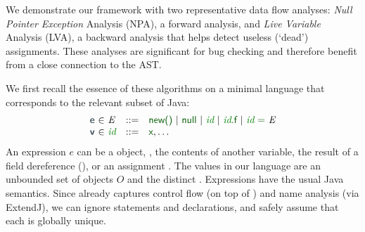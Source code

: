 We demonstrate our framework with two representative data flow analyses:
\emph{Null Pointer Exception} Analysis (NPA), a forward analysis, and \emph{Live Variable} Analysis (LVA), a backward analysis that helps detect useless (`dead') assignments.
These analyses are significant for bug checking and therefore benefit from a close connection to the AST.

We first recall the essence of these algorithms on a minimal language that corresponds to the relevant subset of Java: %
\[
\begin{array}{r@{\ }c@{\ }lcll}
  \vmetavar{e}& \in &
  \nta{E}	& \Prod	& \vterminal{new()}
  			  \VB{}
        		  \vterminal{null}
			  \VB{}
        		  \terminal{id}
			  \VB{}
        		  \terminal{id} \vterminal{.f}
                          \VB{}
                          \terminal{id}\ \vterminal{=}\ \nta{E}
                           \\
  \vmetavar{v}& \in &
  \terminal{id}	& \Prod	& \vterminal{x}, \ldots
\end{array}
\]
%
An expression $e$ can be a  object,
, the contents of another variable, the result of a field dereference (), or an assignment . %
The values in our language are an unbounded set of objects $O$ and the distinct .  Expressions have the usual Java semantics.
Since {\intraj} already captures control flow (on top of {\intracfg}) and name analysis (via ExtendJ), we can ignore
statements and declarations, and safely assume that each  is globally unique.

